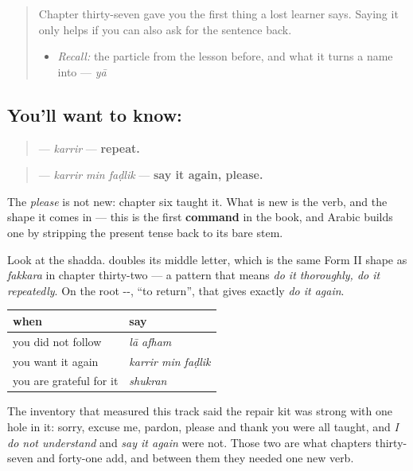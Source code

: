 \label{lesson:AR-C41-karrir}



\begin{quote}
Chapter thirty-seven gave you the first thing a lost learner says. Saying it only helps if you can also ask for the sentence back.

\begin{itemize}
\raggedright
  \item \emph{Recall:} the particle from the lesson before, and what it turns a name into — \emph{yā}
\end{itemize}
\end{quote}

\subsection*{You'll want to know: }
\begin{quote}
\textbf{} — \emph{karrir} — \textbf{repeat.}
\end{quote}

\begin{quote}
\textbf{  } — \emph{karrir min faḍlik} — \textbf{say it again, please.}
\end{quote}

The \emph{please} is not new: chapter six taught it. What is new is the verb, and the shape it comes in — this is the first \textbf{command} in the book, and Arabic builds one by stripping the present tense back to its bare stem.

Look at the shadda. \textbf{} doubles its middle letter, which is the same Form II shape as \emph{fakkara} in chapter thirty-two — a pattern that means \emph{do it thoroughly, do it repeatedly}. On the root --, \textquotedblleft{}to return\textquotedblright{}, that gives exactly \emph{do it again}.

\begin{grammarlens}[title={Grammar Lens: the repair kit, whole}]
\noindent
\begin{tabularx}{\linewidth}{@{}>{\raggedright\arraybackslash}X>{\raggedright\arraybackslash}X@{}}
\toprule
\textbf{when} & \textbf{say} \\
\midrule
you did not follow & \emph{lā afham} \\
you want it again & \emph{karrir min faḍlik} \\
you are grateful for it & \emph{shukran} \\
\bottomrule
\end{tabularx}

The inventory that measured this track said the repair kit was strong with one hole in it: sorry, excuse me, pardon, please and thank you were all taught, and \emph{I do not understand} and \emph{say it again} were not. Those two are what chapters thirty-seven and forty-one add, and between them they needed one new verb.
\end{grammarlens}

